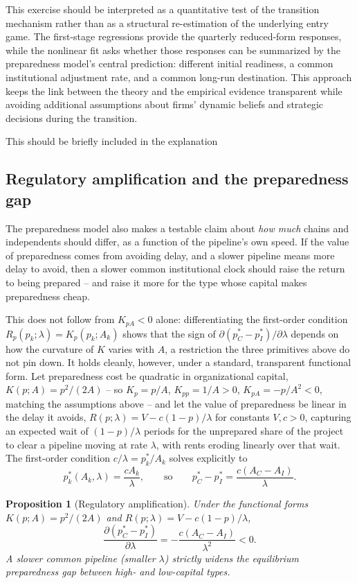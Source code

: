 \documentclass[english,12pt]{article}
\newtheorem{proposition}{Proposition}
\begin{document}
This exercise should be interpreted as a quantitative test of the transition mechanism rather than as a structural re-estimation of the underlying entry game. The first-stage regressions provide the quarterly reduced-form responses, while the nonlinear fit asks whether those responses can be summarized by the preparedness model's central prediction: different initial readiness, a common institutional adjustment rate, and a common long-run destination. This approach keeps the link between the theory and the empirical evidence transparent while avoiding additional assumptions about firms' dynamic beliefs and strategic decisions during the transition.


\color{red} This should be briefly included in the explanation
\subsection{Regulatory amplification and the preparedness gap}
\label{sec:amplification}

The preparedness model also makes a testable claim about \emph{how much} chains and independents should differ, as a function of the pipeline's own speed. If the value of preparedness comes from avoiding delay, and a slower pipeline means more delay to avoid, then a slower common institutional clock should raise the return to being prepared -- and raise it more for the type whose capital makes preparedness cheap.

This does not follow from $K_{pA}<0$ alone: differentiating the first-order condition $R_p(p_k;\lambda)=K_p(p_k;A_k)$ shows that the sign of $\partial(p_C^*-p_I^*)/\partial\lambda$ depends on how the curvature of $K$ varies with $A$, a restriction the three primitives above do not pin down. It holds cleanly, however, under a standard, transparent functional form. Let preparedness cost be quadratic in organizational capital, $K(p;A)=p^2/(2A)$ -- so $K_p=p/A$, $K_{pp}=1/A>0$, $K_{pA}=-p/A^2<0$, matching the assumptions above -- and let the value of preparedness be linear in the delay it avoids, $R(p;\lambda)=V-c(1-p)/\lambda$ for constants $V,c>0$, capturing an expected wait of $(1-p)/\lambda$ periods for the unprepared share of the project to clear a pipeline moving at rate $\lambda$, with rents eroding linearly over that wait. The first-order condition $c/\lambda = p_k^*/A_k$ solves explicitly to
\[
p_k^*(A_k,\lambda) = \frac{cA_k}{\lambda}, \qquad\text{so}\qquad p_C^*-p_I^* = \frac{c(A_C-A_I)}{\lambda}.
\]

\begin{proposition}[Regulatory amplification]
\label{prop:amplification}
Under the functional forms $K(p;A)=p^2/(2A)$ and $R(p;\lambda)=V-c(1-p)/\lambda$,
\[
\frac{\partial(p_C^*-p_I^*)}{\partial\lambda} = -\frac{c(A_C-A_I)}{\lambda^2} < 0.
\]
A slower common pipeline (smaller $\lambda$) strictly widens the equilibrium preparedness gap between high- and low-capital types.
\end{proposition}
\end{document}

